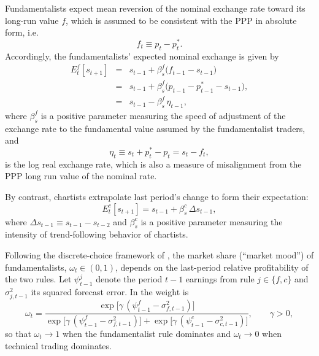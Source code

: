 \documentclass[a4paper,10pt,final]{article}    %
\begin{document}
Fundamentalists expect mean reversion of the nominal exchange rate toward its long-run value $f$, which is assumed to be consistent with the PPP in absolute form, i.e.
\[
    f_t \equiv p_t - p_t^{*}.
\]
Accordingly, the fundamentalists' expected nominal exchange is given by
\begin{eqnarray}
    E_t^{f}[s_{t+1}]
    &=& s_{t-1} + \beta_s^{f}\bigl(f_{t-1}-s_{t-1}\bigr) \nonumber\\
    &=& s_{t-1} + \beta_s^{f}\bigl(p_{t-1} - p_{t-1}^{*} -s_{t-1}\bigr),\nonumber\\
    &=& s_{t-1} - \beta_s^{f}\,\eta_{t-1},
    \label{eq:f_expect}
\end{eqnarray}
where $\beta_s^{f}$ is a positive parameter measuring the speed of adjustment of the exchange rate to the fundamental value assumed by the fundamentalist traders, and
\[
    \eta_t \equiv s_t + p_t^{*} - p_t = s_t - f_t,
\]
is the log real exchange rate, which is also a measure of misalignment from the PPP long run value of the nominal rate.

By contrast, chartists extrapolate last period's change to form their expectation:
\begin{equation}
    E_t^{c}[s_{t+1}]
    = s_{t-1} + \beta_s^{c}\,\Delta s_{t-1},
    \label{eq:c_expect}
\end{equation}
where $\Delta s_{t-1} \equiv s_{t-1}-s_{t-2}$ and $\beta_s^{c}$ is a positive parameter measuring the intensity of trend-following behavior of chartists.

Following the discrete-choice framework of \citet{BrockHommes1997,BrockHommes1998}, the market share (``market mood'') of fundamentalists, $\omega_t \in (0,1)$, depends on the last-period relative profitability of the two rules. Let $\psi_{t-1}^{j}$ denote the period $t-1$ earnings from rule $j\in\{f,c\}$ and $\sigma^{2}_{j,t-1}$ its squared forecast error. In \citet{Proano2011,proano2013monetary} the weight is
\begin{equation}
    \omega_t
    = \frac{\exp\!\bigl[\gamma\,(\psi^{f}_{t-1}-\sigma^{2}_{f,t-1})\bigr]}
    {\exp\!\bigl[\gamma\,(\psi^{f}_{t-1}-\sigma^{2}_{f,t-1})\bigr]
        + \exp\!\bigl[\gamma\,(\psi^{c}_{t-1}-\sigma^{2}_{c,t-1})\bigr]},
    \qquad \gamma>0,
    \label{eq:omega}
\end{equation}
so that $\omega_t \to 1$ when the fundamentalist rule dominates and $\omega_t \to 0$ when technical trading dominates.
\end{document}
